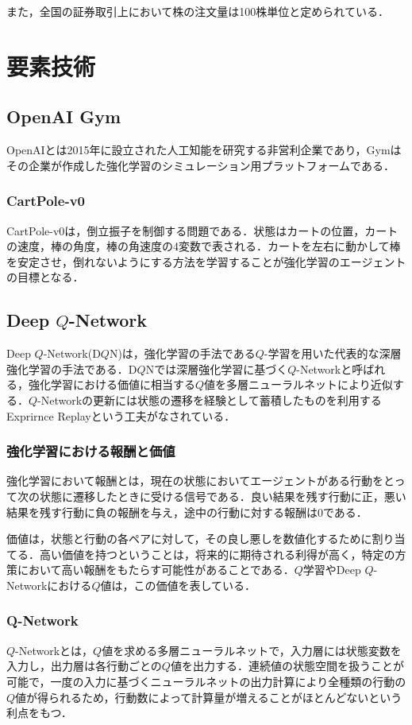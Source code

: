 \documentclass[twocolumn]{jarticle}
\begin{document}
    また，全国の証券取引上において株の注文量は100株単位と定められている．

\section{要素技術}

    \subsection{OpenAI Gym}
    OpenAIとは2015年に設立された人工知能を研究する非営利企業であり，Gymはその企業が作成した強化学習のシミュレーション用プラットフォームである．

        \subsubsection{CartPole-v0}
        CartPole-v0は，倒立振子を制御する問題である．状態はカートの位置，カートの速度，棒の角度，棒の角速度の4変数で表される．カートを左右に動かして棒を安定させ，倒れないようにする方法を学習することが強化学習のエージェントの目標となる．

    \subsection{Deep $Q$-Network}
    Deep $Q$-Network(D$Q$N)は，強化学習の手法である$Q$-学習を用いた代表的な深層強化学習の手法である．D$Q$Nでは深層強化学習に基づく$Q$-Networkと呼ばれる，強化学習における価値に相当する$Q$値を多層ニューラルネットにより近似する．$Q$-Networkの更新には状態の遷移を経験として蓄積したものを利用するExprirnce Replayという工夫がなされている．

        \subsubsection{強化学習における報酬と価値}
        強化学習において報酬とは，現在の状態においてエージェントがある行動をとって次の状態に遷移したときに受ける信号である．良い結果を残す行動に正，悪い結果を残す行動に負の報酬を与え，途中の行動に対する報酬は0である．

        価値は，状態と行動の各ペアに対して，その良し悪しを数値化するために割り当てる．高い価値を持つということは，将来的に期待される利得が高く，特定の方策において高い報酬をもたらす可能性があることである．$Q$学習やDeep $Q$-Networkにおける$Q$値は，この価値を表している．

        \subsubsection{Q-Network}
        $Q$-Networkとは，$Q$値を求める多層ニューラルネットで，入力層には状態変数を入力し，出力層は各行動ごとの$Q$値を出力する．連続値の状態空間を扱うことが可能で，一度の入力に基づくニューラルネットの出力計算により全種類の行動の$Q$値が得られるため，行動数によって計算量が増えることがほとんどないという利点をもつ．
\end{document}
